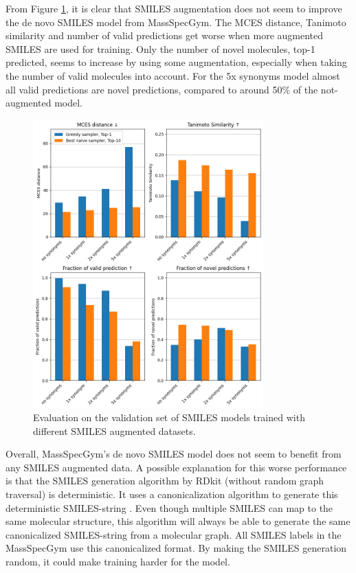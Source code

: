 From Figure \ref{fig:smiles_augm}, it is clear that SMILES augmentation does not seem to improve the de novo SMILES model from MassSpecGym.
The MCES distance, Tanimoto similarity and number of valid predictions get worse when more augmented SMILES are used for training.
Only the number of novel molecules, top-1 predicted, seems to increase by using some augmentation, especially when taking the number of valid molecules into account. 
For the 5x synonyms model almost all valid predictions are novel predictions, compared to around 50\% of the not-augmented model.

\begin{figure}[h]
    \centering
    \includegraphics[width=0.79\textwidth]{figures/results/smiles_augmentation_with_tanimoto.png}
    \caption{Evaluation on the validation set of SMILES models trained with different SMILES augmented datasets.}
    \label{fig:smiles_augm}
\end{figure}

\newpage
Overall, MassSpecGym's de novo SMILES model does not seem to benefit from any SMILES augmented data.
A possible explanation for this worse performance is that the SMILES generation algorithm by RDkit (without random graph traversal) is deterministic.
It uses a canonicalization algorithm to generate this deterministic SMILES-string \cite{daylight_smiles_theory}.
Even though multiple SMILES can map to the same molecular structure, this algorithm will always be able to generate the same canonicalized SMILES-string from a molecular graph.
All SMILES labels in the MassSpecGym use this canonicalized format. 
By making the SMILES generation random, it could make training harder for the model.

